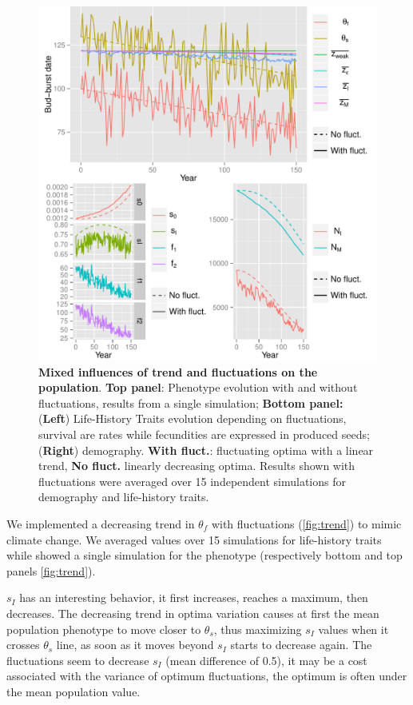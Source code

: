 \begin{figure}[ht!]
	\centering
	\includegraphics[scale=1]{Figures/Trend.pdf}
	\caption{\textbf{Mixed influences of trend and fluctuations on the population}. \textbf{Top panel}: Phenotype evolution with and without fluctuations, results from a single simulation; \textbf{Bottom panel:} (\textbf{Left}) Life-History Traits evolution depending on fluctuations, survival are rates while fecundities are expressed in produced seeds; (\textbf{Right}) demography. \textbf{With fluct.}: fluctuating optima with a linear trend, \textbf{No fluct.} linearly decreasing optima. Results shown with fluctuations were averaged over 15 independent simulations for demography and life-history traits.}
	\label{fig:trend}
\end{figure}

We implemented a decreasing trend in $\theta_f$ with fluctuations (\autoref{fig:trend}) to mimic climate change.
We averaged values over 15 simulations for life-history traits while showed a single simulation for the phenotype (respectively bottom and top panels \autoref{fig:trend}).

$s_I$ has an interesting behavior, it first increases, reaches a maximum, then decreases. The decreasing trend in optima variation causes at first the mean population phenotype to move closer to $\theta_s$, thus maximizing $s_I$ values when it crosses $\theta_s$ line, as soon as it moves beyond $s_I$ starts to decrease again. The fluctuations seem to decrease $s_I$ (mean difference of 0.5), it may be a cost associated with the variance of optimum fluctuations, the optimum is often under the mean population value.

